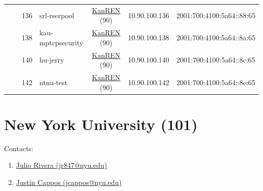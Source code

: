 \begin{small}
\begin{center}
\begin{longtable}{|c|c|c|c|c|c|c|c|}
  &  & \tiny{136} & \multicolumn{1}{|l|}{\tiny{srl-rserpool}} & \multicolumn{2}{|c|}{\tiny{\href{http://www.kanren.net}{KanREN} (90)}} & \tiny{10.90.100.136} & \tiny{2001:700:4100:5a64::88:65} \\* \cline{3-3}\cline{4-4}\cline{5-5}\cline{6-6}\cline{7-7}\cline{8-8}
  &  & \tiny{138} & \multicolumn{1}{|l|}{\tiny{kau-mptcpsecurity}} & \multicolumn{2}{|c|}{\tiny{\href{http://www.kanren.net}{KanREN} (90)}} & \tiny{10.90.100.138} & \tiny{2001:700:4100:5a64::8a:65} \\* \cline{3-3}\cline{4-4}\cline{5-5}\cline{6-6}\cline{7-7}\cline{8-8}
  &  & \tiny{140} & \multicolumn{1}{|l|}{\tiny{hu-jerry}} & \multicolumn{2}{|c|}{\tiny{\href{http://www.kanren.net}{KanREN} (90)}} & \tiny{10.90.100.140} & \tiny{2001:700:4100:5a64::8c:65} \\* \cline{3-3}\cline{4-4}\cline{5-5}\cline{6-6}\cline{7-7}\cline{8-8}
  &  & \tiny{142} & \multicolumn{1}{|l|}{\tiny{ntnu-test}} & \multicolumn{2}{|c|}{\tiny{\href{http://www.kanren.net}{KanREN} (90)}} & \tiny{10.90.100.142} & \tiny{2001:700:4100:5a64::8e:65} \\ \hline
\end{longtable}
\end{center}
\end{small}



\section{New York University (101)}
\label{sec:NYU}

Contacts:
\begin{enumerate}
 \item {}\href{mailto:jr847@nyu.edu}{Julio Rivera (jr847@nyu.edu)}
 \item {}\href{mailto:jcappos@nyu.edu}{Justin Cappos (jcappos@nyu.edu)}
\end{enumerate}

